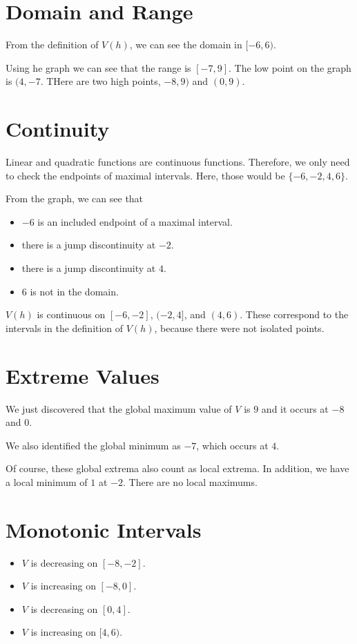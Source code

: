 \documentclass{ximera}
\begin{document}
\section{Domain and Range} 

From the definition of $V(h)$, we can see the domain in $[-6, 6)$.

Using he graph we can see that the range is $[-7, 9]$.   The low point on the graph is $(4, -7$.  THere are two high points, $-8,9)$ and $(0,9)$.









\section{Continuity} 


Linear and quadratic functions are continuous functions.  Therefore, we only need to check the endpoints of maximal intervals.  Here, those would be $\{ -6, -2, 4, 6 \}$.

From the graph, we can see that 

\begin{itemize}
\item $-6$ is an included endpoint of a maximal interval.  
\item there is a jump discontinuity at $-2$.
\item there is a jump discontinuity at $4$.
\item $6$ is not in the domain.
\end{itemize}


$V(h)$ is continuous on $[-6, -2]$, $(-2, 4]$, and $(4, 6)$.  These correspond to the intervals in the definition of $V(h)$, because there were not isolated points.






\section{Extreme Values} 


We just discovered that the global maximum value of $V$ is $9$ and it occurs at $-8$ and $0$.

We also identified the global minimum as $-7$, which occurs at $4$.


Of course, these global extrema also count as local extrema.  In addition, we have a local minimum of $1$ at $-2$. There are no local maximums.







\section{Monotonic Intervals} 



\begin{itemize}
\item $V$ is decreasing on $[-8,-2]$.
\item $V$ is increasing on $[-8,0]$.
\item $V$ is decreasing on $[0,4]$.
\item $V$ is increasing on $[4,6)$.
\end{itemize}
\end{document}

